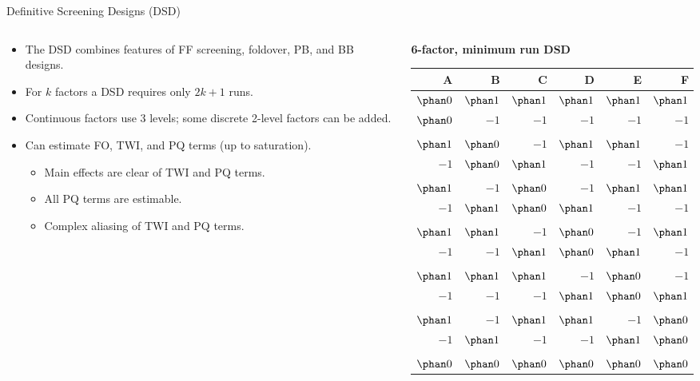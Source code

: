 \documentclass[9pt]{beamer}
\newcommand\lo{$-1$}
\newcommand\hi{$\phan1$}
\newcommand\ze{$\phan0$}
\begin{document}
\begin{frame}{Definitive Screening Designs (DSD)}

\begin{columns}
\begin{column}{0.5\textwidth}
	\begin{itemize}
		\item The DSD combines features of FF screening, foldover, PB, and BB designs.
		\item For $k$ factors a DSD requires only $2k+1$ runs.
		\item Continuous factors use 3 levels; some discrete 2-level factors can be added.
		\item Can estimate FO, TWI, and PQ terms (up to saturation).
		\begin{itemize}
			\item Main effects are clear of TWI and PQ terms.
			\item All PQ terms are estimable.
			\item Complex aliasing of TWI and PQ terms.
		\end{itemize}
	\end{itemize}
\end{column}
\begin{column}{0.5\textwidth}{\footnotesize
	\begin{center}
		\textbf{6-factor, minimum run DSD}
		\begin{tabular}{rrrrrr}
			\toprule
			A & B & C & D & E & F \\
			\midrule
			\ze & \hi & \hi & \hi & \hi & \hi \\
			\ze & \lo & \lo & \lo & \lo & \lo \\
			\\
			\hi & \ze & \lo & \hi & \hi & \lo \\
			\lo & \ze & \hi & \lo & \lo & \hi \\
			\\
			\hi & \lo & \ze & \lo & \hi & \hi \\
			\lo & \hi & \ze & \hi & \lo & \lo \\
			\\
			\hi & \hi & \lo & \ze & \lo & \hi \\
			\lo & \lo & \hi & \ze & \hi & \lo \\
			\\
			\hi & \hi & \hi & \lo & \ze & \lo \\
			\lo & \lo & \lo & \hi & \ze & \hi \\
			\\
			\hi & \lo & \hi & \hi & \lo & \ze \\
			\lo & \hi & \lo & \lo & \hi & \ze \\
			\\
			\ze & \ze & \ze & \ze & \ze & \ze \\
			\bottomrule
		\end{tabular}
	\end{center}
}
\end{column}
\end{columns}
	
\end{frame}
\end{document}
